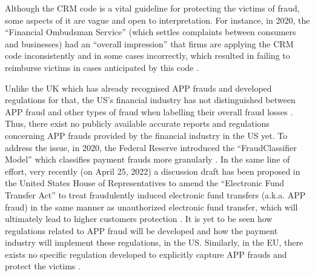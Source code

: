 Although the CRM code is a vital guideline for protecting the victims of fraud, some aspects of it are vague and open to interpretation. For instance, in 2020, the ``Financial Ombudsman Service'' (which settles complaints between consumers and businesses)  had an ``overall impression'' that firms are applying the CRM code inconsistently and in some cases incorrectly, which resulted in failing to reimburse victims in cases anticipated by this code \cite{Financial-Ombudsman-Service-response}.  %



Unlike the UK which has already recognised APP frauds and developed regulations for that,  the US's financial industry has not distinguished between APP fraud and other types of fraud when labelling their overall fraud losses \cite{P20-report}. Thus, there exist no publicly available accurate reports and regulations concerning APP frauds provided by the financial industry in the US yet.  To address the issue, in 2020, the Federal Reserve introduced the ``FraudClassifier Model'' which classifies payment frauds more granularly \cite{Fraud-Classifier}. In the same line of effort, very recently (on April 25, 2022) a discussion draft has been proposed in the United States House of Representatives to amend the ``Electronic Fund Transfer Act'' to treat fraudulently induced electronic fund transfers (a.k.a. APP fraud) in the same manner as unauthorized electronic fund transfer, which will ultimately lead to higher customers protection \cite{the-bill}. It is yet to be seen how regulations related to APP fraud will be developed and how the payment industry will implement these regulations, in the US. Similarly, in the EU, there  exists no specific regulation developed 
%
%
%
to explicitly capture APP frauds and protect the victims \cite{kjorven2020pays,McIlroy2021}.














